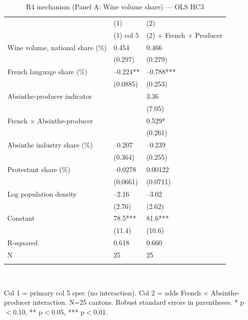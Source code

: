 \begin{table}[tbp] \centering
{}

\caption{R4 mechanism (Panel A: Wine volume share) --- OLS HC3}
\label{tab:T5_X2}
\begin{tabularx}{\linewidth}{@{}lCC@{}}

\toprule
&{(1)}&{(2)} \tabularnewline
 & (1) col 5 & (2) + French $\times$ Producer \tabularnewline 
\midrule \addlinespace[\belowrulesep]
Wine volume, national share (\%)&0.454&0.466 \tabularnewline
&(0.297)&(0.279) \tabularnewline
French language share (\%)&--0.224**&--0.788*** \tabularnewline
&(0.0885)&(0.253) \tabularnewline
Absinthe-producer indicator&&3.36 \tabularnewline
&&(7.05) \tabularnewline
French $\times$ Absinthe-producer&&0.529* \tabularnewline
&&(0.261) \tabularnewline
Absinthe industry share (\%)&--0.207&--0.239 \tabularnewline
&(0.364)&(0.255) \tabularnewline
Protestant share (\%)&--0.0278&0.00122 \tabularnewline
&(0.0661)&(0.0711) \tabularnewline
Log population density&--2.16&--3.02 \tabularnewline
&(2.76)&(2.62) \tabularnewline
Constant&78.5***&81.6*** \tabularnewline
&(11.4)&(10.6) \tabularnewline
\midrule R-squared&0.618&0.660 \tabularnewline
N&25&25 \tabularnewline
\bottomrule \addlinespace[\belowrulesep]

\end{tabularx}
\\ \parbox{\linewidth}{\footnotesize Col 1 = primary col 5 spec (no interaction). Col 2 = adds French $\times$ Absinthe-producer interaction. N=25 cantons. Robust standard errors in parentheses. * p\(<\)0.10, ** p\(<\)0.05, *** p\(<\)0.01.}
\end{table}
